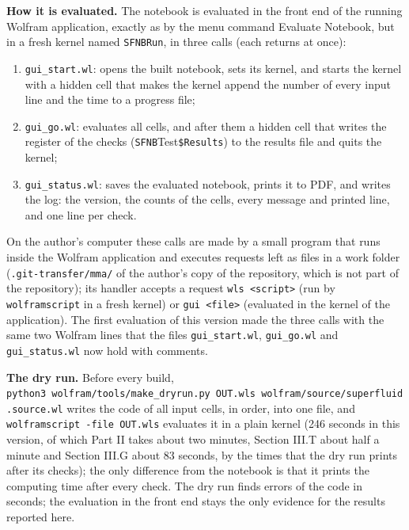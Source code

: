 \documentclass[
  10pt,
]{article}
\providecommand{\tightlist}{%
  \setlength{\itemsep}{0pt}\setlength{\parskip}{0pt}}
\begin{document}
\textbf{How it is evaluated.} The notebook is evaluated in the front end
of the running Wolfram application, exactly as by the menu command
Evaluate Notebook, but in a fresh kernel named \texttt{SFNBRun}, in
three calls (each returns at once):

\begin{enumerate}
\def\labelenumi{\arabic{enumi}.}
\tightlist
\item
  \texttt{gui\_start.wl}: opens the built notebook, sets its kernel, and
  starts the kernel with a hidden cell that makes the kernel append the
  number of every input line and the time to a progress file;
\item
  \texttt{gui\_go.wl}: evaluates all cells, and after them a hidden cell
  that writes the register of the checks
  (\texttt{SFNB}Test\texttt{\$Results}) to the results file and quits
  the kernel;
\item
  \texttt{gui\_status.wl}: saves the evaluated notebook, prints it to
  PDF, and writes the log: the version, the counts of the cells, every
  message and printed line, and one line per check.
\end{enumerate}

On the author's computer these calls are made by a small program that
runs inside the Wolfram application and executes requests left as files
in a work folder (\texttt{.git-transfer/mma/} of the author's copy of
the repository, which is not part of the repository); its handler
accepts a request \texttt{wls\ \textless{}script\textgreater{}} (run by
\texttt{wolframscript} in a fresh kernel) or
\texttt{gui\ \textless{}file\textgreater{}} (evaluated in the kernel of
the application). The first evaluation of this version made the three
calls with the same two Wolfram lines that the files
\texttt{gui\_start.wl}, \texttt{gui\_go.wl} and \texttt{gui\_status.wl}
now hold with comments.

\textbf{The dry run.} Before every build,
\texttt{python3\ wolfram/tools/make\_dryrun.py\ OUT.wls\ wolfram/source/superfluid.source.wl}
writes the code of all input cells, in order, into one file, and
\texttt{wolframscript\ -file\ OUT.wls} evaluates it in a plain kernel
(246 seconds in this version, of which Part II takes about two minutes,
Section III.T about half a minute and Section III.G about 83 seconds, by
the times that the dry run prints after its checks); the only difference
from the notebook is that it prints the computing time after every
check. The dry run finds errors of the code in seconds; the evaluation
in the front end stays the only evidence for the results reported here.
\end{document}
